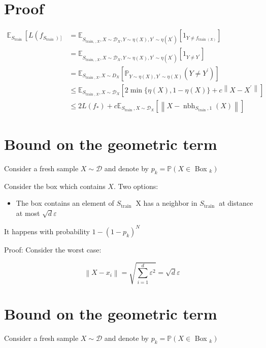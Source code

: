 \section*{Proof}
$$
\begin{aligned}
\mathbb{E}_{S_{\text {train }}}\left[L \left(f_{\left.\left.S_{\text {train }}\right)\right]}\right.\right. & =\mathbb{E}_{S_{\text {train, }, X}, X \sim \mathscr{D}_{X}, Y \sim \eta(X), Y^{\prime} \sim \eta\left(X^{\prime}\right)}\left[1_{Y \neq f_{\text {train }(X)}}\right] \\
& =\mathbb{E}_{S_{\text {train, }, X}, X \sim \mathscr{D}_{X}, Y \sim \eta(X), Y^{\prime} \sim \eta\left(X^{\prime}\right)}\left[1_{Y \neq Y^{\prime}}\right] \\
& =\mathbb{E}_{S_{\text {train }, X}, X \sim D_{X}}\left[\mathbb{P}_{Y \sim \eta(X), Y^{\prime} \sim \eta(X)}\left(Y \neq Y^{\prime}\right)\right] \\
& \leq \mathbb{E}_{S_{\text {train }, X}, X \sim \mathscr{D}_{X}}\left[2 \min \{\eta(X), 1-\eta(X)\}+c\left\|X-X^{\prime}\right\|\right] \\
& \leq 2 L\left(f_{*}\right)+c \mathbb{E}_{S_{\text {train }}, X \sim \mathscr{D}_{X}}\left[\left\|X-\operatorname{nbh}_{S_{\text {train }}, 1}(X)\right\|\right]
\end{aligned}
$$

\section*{Bound on the geometric term}
Consider a fresh sample $X \sim \mathscr{D}$ and denote by $p_{k}=\mathbb{P}\left(X \in\right.$ Box $\left._{k}\right)$

Consider the box which contains $X$. Two options:

\begin{itemize}
  \item The box contains an element of $S_{\text {train }}$ X has a neighbor in $S_{\text {train }}$ at distance at most $\sqrt{d} \varepsilon$
\end{itemize}

It happens with probability $1-\left(1-p_{k}\right)^{N}$

Proof: Consider the worst case:

$$
\left\|X-x_{i}\right\|=\sqrt{\sum_{i=1}^{d} \varepsilon^{2}}=\sqrt{d} \varepsilon
$$


\section*{Bound on the geometric term}
Consider a fresh sample $X \sim \mathscr{D}$ and denote by $p_{k}=\mathbb{P}\left(X \in\right.$ Box $\left._{k}\right)$

